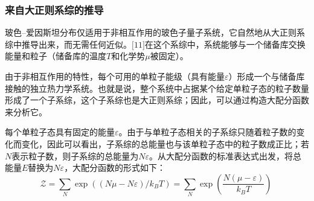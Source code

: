 \subsubsection{来自大正则系综的推导}  
玻色–爱因斯坦分布仅适用于非相互作用的玻色子量子系统，它自然地从大正则系综中推导出来，而无需任何近似。\(\text{[11]}\)在这个系综中，系统能够与一个储备库交换能量和粒子（储备库的温度\(T\)和化学势\(\mu\)被固定）。

由于非相互作用的特性，每个可用的单粒子能级（具有能量\(\varepsilon\)）形成一个与储备库接触的独立热力学系统。也就是说，整个系统中占据某个给定单粒子态的粒子数量形成了一个子系综，这个子系综也是大正则系综；因此，可以通过构造大配分函数来分析它。

每个单粒子态具有固定的能量\(\varepsilon\)。由于与单粒子态相关的子系综只随着粒子数的变化而变化，因此可以看出，子系综的总能量也与该单粒子态中的粒子数成正比；若\(N\)表示粒子数，则子系综的总能量为\(N\varepsilon\)。从大配分函数的标准表达式出发，将总能量\(E\)替换为\(N\varepsilon\)，大配分函数的形式如下：
\[
\mathcal{Z} = \sum_{N} \exp\left((N\mu - N\varepsilon)/k_B T\right) = \sum_{N} \exp\left(\frac{N(\mu - \varepsilon)}{k_B T}\right)~
\]